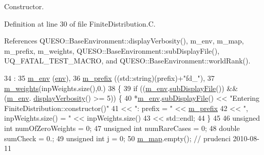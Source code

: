 Constructor. 



Definition at line 30 of file Finite\-Distribution.\-C.



References Q\-U\-E\-S\-O\-::\-Base\-Environment\-::display\-Verbosity(), m\-\_\-env, m\-\_\-map, m\-\_\-prefix, m\-\_\-weights, Q\-U\-E\-S\-O\-::\-Base\-Environment\-::sub\-Display\-File(), U\-Q\-\_\-\-F\-A\-T\-A\-L\-\_\-\-T\-E\-S\-T\-\_\-\-M\-A\-C\-R\-O, and Q\-U\-E\-S\-O\-::\-Base\-Environment\-::world\-Rank().


\begin{DoxyCode}
34   :
35   \hyperlink{class_q_u_e_s_o_1_1_finite_distribution_a1e3d075444dbb96d4d31b51a7eafed41}{m\_env}    (\hyperlink{class_q_u_e_s_o_1_1_finite_distribution_a9ebc6c7cea43a32f794c55650bee5a95}{env}),
36   \hyperlink{class_q_u_e_s_o_1_1_finite_distribution_a0e437054e07abf8fbc80d5a5bb14c27d}{m\_prefix} ((std::string)(prefix)+\textcolor{stringliteral}{"fd\_"}),
37   \hyperlink{class_q_u_e_s_o_1_1_finite_distribution_a37ce51dce9fa6b755277281d6dd7c052}{m\_weights}(inpWeights.size(),0.)
38 \{
39   \textcolor{keywordflow}{if} ((\hyperlink{class_q_u_e_s_o_1_1_finite_distribution_a1e3d075444dbb96d4d31b51a7eafed41}{m\_env}.\hyperlink{class_q_u_e_s_o_1_1_base_environment_a8a0064746ae8dddfece4229b9ad374d6}{subDisplayFile}()) && (\hyperlink{class_q_u_e_s_o_1_1_finite_distribution_a1e3d075444dbb96d4d31b51a7eafed41}{m\_env}.
      \hyperlink{class_q_u_e_s_o_1_1_base_environment_a1fe5f244fc0316a0ab3e37463f108b96}{displayVerbosity}() >= 5)) \{
40     *\hyperlink{class_q_u_e_s_o_1_1_finite_distribution_a1e3d075444dbb96d4d31b51a7eafed41}{m\_env}.\hyperlink{class_q_u_e_s_o_1_1_base_environment_a8a0064746ae8dddfece4229b9ad374d6}{subDisplayFile}() << \textcolor{stringliteral}{"Entering FiniteDistribution::constructor()"}
41                             << \textcolor{stringliteral}{": prefix = "} << \hyperlink{class_q_u_e_s_o_1_1_finite_distribution_a0e437054e07abf8fbc80d5a5bb14c27d}{m\_prefix}
42                             << \textcolor{stringliteral}{", inpWeights.size() = "} << inpWeights.size()
43                             << std::endl;
44   \}
45 
46   \textcolor{keywordtype}{unsigned} \textcolor{keywordtype}{int} numOfZeroWeights = 0;
47   \textcolor{keywordtype}{unsigned} \textcolor{keywordtype}{int} numRareCases = 0;
48   \textcolor{keywordtype}{double} sumCheck = 0.;
49   \textcolor{keywordtype}{unsigned} \textcolor{keywordtype}{int} j = 0;
50   \hyperlink{class_q_u_e_s_o_1_1_finite_distribution_a7b0ba94a9f10793519056eaf612cbeb1}{m\_map}.empty(); \textcolor{comment}{// prudenci 2010-08-11}

\end{DoxyCode}
